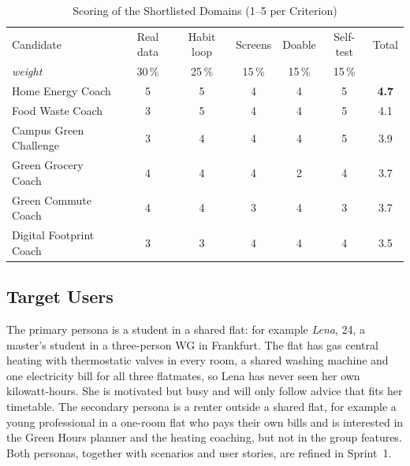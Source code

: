 \documentclass[conference]{IEEEtran}
\begin{document}
\begin{table}[!t]
\caption{Scoring of the Shortlisted Domains (1--5 per Criterion)}
\label{tab:selection}
\centering
\scriptsize
\setlength{\tabcolsep}{3.5pt}
\begin{tabular}{@{}lcccccc@{}}
\toprule
Candidate & Real data & Habit loop & Screens & Doable & Self-test & Total \\
\emph{weight} & 30\,\% & 25\,\% & 15\,\% & 15\,\% & 15\,\% & \\
\midrule
Home Energy Coach      & 5 & 5 & 4 & 4 & 5 & \textbf{4.7} \\
Food Waste Coach       & 3 & 5 & 4 & 4 & 5 & 4.1 \\
Campus Green Challenge & 3 & 4 & 4 & 4 & 5 & 3.9 \\
Green Grocery Coach    & 4 & 4 & 4 & 2 & 4 & 3.7 \\
Green Commute Coach    & 4 & 4 & 3 & 4 & 3 & 3.7 \\
Digital Footprint Coach& 3 & 3 & 4 & 4 & 4 & 3.5 \\
\bottomrule
\end{tabular}
\end{table}

\subsection{Target Users}
The primary persona is a student in a shared flat: for example \emph{Lena}, 24, a master's student in a three-person WG in Frankfurt. The flat has gas central heating with thermostatic valves in every room, a shared washing machine and one electricity bill for all three flatmates, so Lena has never seen her own kilowatt-hours. She is motivated but busy and will only follow advice that fits her timetable. The secondary persona is a renter outside a shared flat, for example a young professional in a one-room flat who pays their own bills and is interested in the Green Hours planner and the heating coaching, but not in the group features. Both personas, together with scenarios and user stories, are refined in Sprint~1.
\end{document}
